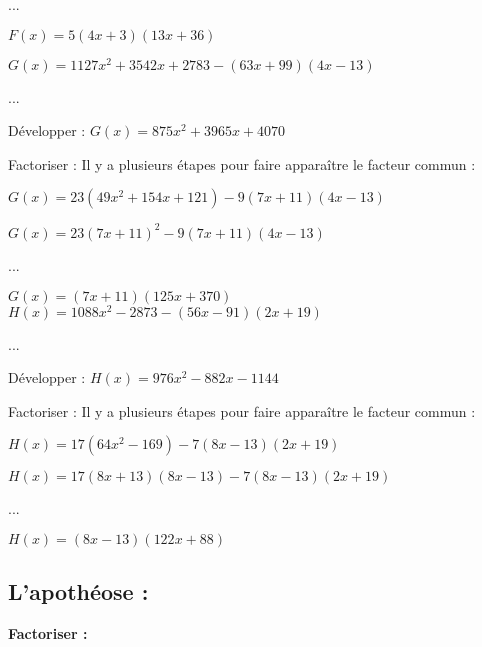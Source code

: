 ...

$ F(x) = 5\left(4x+3\right)\left(13x+36\right)$

\newpage

$ G(x) = 1127x^2 + 3542x + 2783 - \left(63x + 99\right)\left(4x-13\right) $

...

Développer : $ G(x) = 875x^2 + 3965x + 4070 $

Factoriser : Il y a plusieurs étapes pour faire apparaître le facteur commun :

$ G(x) = 23\left(49x^2 + 154x + 121\right) - 9\left(7x + 11\right)\left(4x-13\right) $

$ G(x) = 23\left(7x+11\right)^2 - 9\left(7x + 11\right)\left(4x-13\right) $

...

$ G(x) = \left(7x+11\right)\left(125x+370\right) $ \\

$ H(x) = 1088x^2 - 2873 - \left(56x-91\right)\left(2x+19\right) $

...

Développer : $ H(x) = 976x^2 - 882x - 1144 $

Factoriser : Il y a plusieurs étapes pour faire apparaître le facteur commun :

$ H(x) = 17\left(64x^2 - 169\right) - 7\left(8x-13\right)\left(2x+19\right) $

$ H(x) = 17\left(8x+13\right)\left(8x-13\right) - 7\left(8x-13\right)\left(2x+19\right) $

...

$ H(x) = \left(8x-13\right)\left(122x + 88\right) $ \\

\newpage 
\subsection{L'apothéose :}

\textbf{Factoriser :}

\vspace{1cm}

